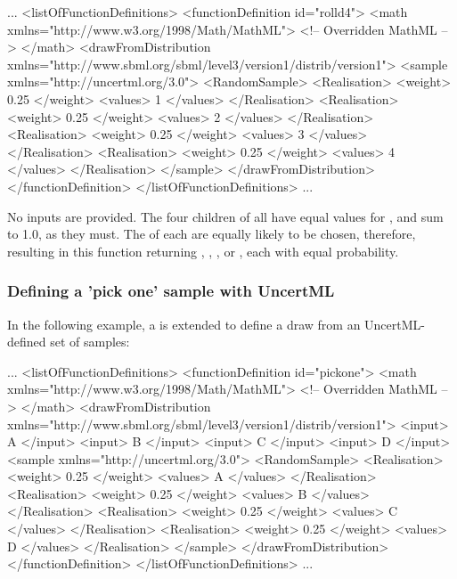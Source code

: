 \documentclass[draftspec]{sbmlpkgspec}
\begin{document}
\begin{example}
...
  <listOfFunctionDefinitions>
    <functionDefinition id="rolld4">
      <math xmlns="http://www.w3.org/1998/Math/MathML">
        <!-- Overridden MathML -->
      </math>
      <drawFromDistribution xmlns="http://www.sbml.org/sbml/level3/version1/distrib/version1">
         <sample xmlns="http://uncertml.org/3.0">
           <RandomSample>
             <Realisation>
               <weight> 0.25 </weight>
               <values> 1 </values>
             </Realisation>
             <Realisation>
               <weight> 0.25 </weight>
               <values> 2 </values>
             </Realisation>
             <Realisation>
               <weight> 0.25 </weight>
               <values> 3 </values>
             </Realisation>
             <Realisation>
               <weight> 0.25 </weight>
               <values> 4 </values>
             </Realisation>
         </sample>
      </drawFromDistribution>
    </functionDefinition>
  </listOfFunctionDefinitions>
...
\end{example}

No inputs are provided.  The four  children of  all have equal values for , and sum to 1.0, as they must.  The  of each are equally likely to be chosen, therefore, resulting in this function returning , , , or , each with equal probability.



\subsubsection{Defining a 'pick one' sample with UncertML}
In the following example, a \FunctionDefinition is extended to define a draw from an UncertML-defined set of samples:

\begin{example}
...
  <listOfFunctionDefinitions>
    <functionDefinition id="pickone">
      <math xmlns="http://www.w3.org/1998/Math/MathML">
        <!-- Overridden MathML -->
      </math>
      <drawFromDistribution xmlns="http://www.sbml.org/sbml/level3/version1/distrib/version1">
         <input> A </input>
         <input> B </input>
         <input> C </input>
         <input> D </input>
         <sample xmlns="http://uncertml.org/3.0">
           <RandomSample>
             <Realisation>
               <weight> 0.25 </weight>
               <values> A </values>
             </Realisation>
             <Realisation>
               <weight> 0.25 </weight>
               <values> B </values>
             </Realisation>
             <Realisation>
               <weight> 0.25 </weight>
               <values> C </values>
             </Realisation>
             <Realisation>
               <weight> 0.25 </weight>
               <values> D </values>
             </Realisation>
         </sample>
      </drawFromDistribution>
    </functionDefinition>
  </listOfFunctionDefinitions>
...
\end{example}
\end{document}
